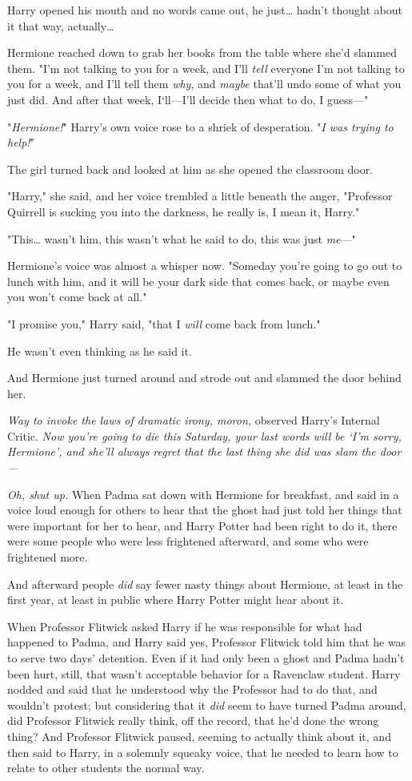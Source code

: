 Harry opened his mouth and no words came out, he just{\ldots} hadn't thought
about it that way, actually{\ldots}

Hermione reached down to grab her books from the table where she'd slammed
them. "I'm not talking to you for a week, and I'll \emph{tell} everyone I'm not
talking to you for a week, and I'll tell them \emph{why}, and \emph{maybe}
that'll undo some of what you just did. And after that week, I`ll---I'll decide
then what to do, I guess---"

"\emph{Hermione!}" Harry's own voice rose to a shriek of desperation. "\emph{I
was trying to help!}"

The girl turned back and looked at him as she opened the classroom door.

"Harry," she said, and her voice trembled a little beneath the anger,
"Professor Quirrell is sucking you into the darkness, he really is, I mean it,
Harry."

"This{\ldots} wasn't him, this wasn't what he said to do, this was just
\emph{me}---"

Hermione's voice was almost a whisper now. "Someday you're going to go out to
lunch with him, and it will be your dark side that comes back, or maybe even
you won't come back at all."

"I promise you," Harry said, "that I \emph{will} come back from lunch."

He wasn't even thinking as he said it.

And Hermione just turned around and strode out and slammed the door behind her.

\emph{Way to invoke the laws of dramatic irony, moron,} observed Harry's
Internal Critic. \emph{Now you're going to die this Saturday, your last words
will be `I'm sorry, Hermione', and she'll always regret that the last thing she
did was slam the door---}

\emph{Oh, shut up.}
\sbreak
When Padma sat down with Hermione for breakfast, and said in a voice loud
enough for others to hear that the ghost had just told her things that were
important for her to hear, and Harry Potter had been right to do it, there were
some people who were less frightened afterward, and some who were frightened
more.

And afterward people \emph{did} say fewer nasty things about Hermione, at least
in the first year, at least in public where Harry Potter might hear about it.

When Professor Flitwick asked Harry if he was responsible for what had happened
to Padma, and Harry said yes, Professor Flitwick told him that he was to serve
two days' detention. Even if it had only been a ghost and Padma hadn't been
hurt, still, that wasn't acceptable behavior for a Ravenclaw student. Harry
nodded and said that he understood why the Professor had to do that, and
wouldn't protest; but considering that it \emph{did} seem to have turned Padma
around, did Professor Flitwick really think, off the record, that he'd done the
wrong thing? And Professor Flitwick paused, seeming to actually think about it,
and then said to Harry, in a solemnly squeaky voice, that he needed to learn
how to relate to other students the normal way.

